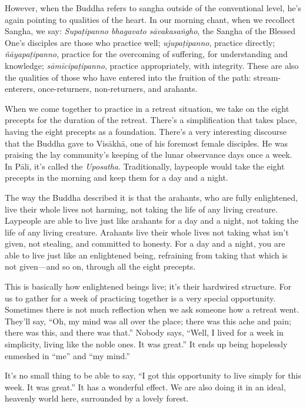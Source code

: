 However, when the Buddha refers to sangha outside of the conventional
level, he’s again pointing to qualities of the heart. In our morning
chant, when we recollect Sangha, we say: \emph{Supaṭipanno bhagavato
sāvakasaṅgho}, the Sangha of the Blessed One’s disciples are those who
practice well; \emph{ujupaṭipanno}, practice directly;
\emph{ñāyapaṭipanno}, practice for the overcoming of suffering, for
understanding and knowledge; \emph{sāmīcipaṭipanno}, practice
appropriately, with integrity. These are also the qualities of those who
have entered into the fruition of the path: stream-enterers,
once-returners, non-returners, and arahants.

When we come together to practice in a retreat situation, we take on the
eight precepts for the duration of the retreat. There’s a simplification
that takes place, having the eight precepts as a foundation. There’s a
very interesting discourse that the Buddha gave to Visākhā, one of his
foremost female disciples. He was praising the lay community’s keeping
of the lunar observance days once a week. In Pāli, it’s called the
\emph{Uposatha}. Traditionally, laypeople would take the eight precepts
in the morning and keep them for a day and a night.

The way the Buddha described it is that the arahants, who are fully
enlightened, live their whole lives not harming, not taking the life of
any living creature. Laypeople are able to live just like arahants for a
day and a night, not taking the life of any living creature. Arahants
live their whole lives not taking what isn’t given, not stealing, and
committed to honesty. For a day and a night, you are able to live just
like an enlightened being, refraining from taking that which is not
given—and so on, through all the eight precepts.

This is basically how enlightened beings live; it’s their hardwired
structure. For us to gather for a week of practicing together is a very
special opportunity. Sometimes there is not much reflection when we ask
someone how a retreat went. They’ll say, “Oh, my mind was all over the
place; there was this ache and pain; there was this, and there was
that.” Nobody says, “Well, I lived for a week in simplicity, living like
the noble ones. It was great.” It ends up being hopelessly enmeshed in
“me” and “my mind.”

It’s no small thing to be able to say, “I got this opportunity to live
simply for this week. It was great.” It has a wonderful effect. We are
also doing it in an ideal, heavenly world here, surrounded by a lovely
forest.

